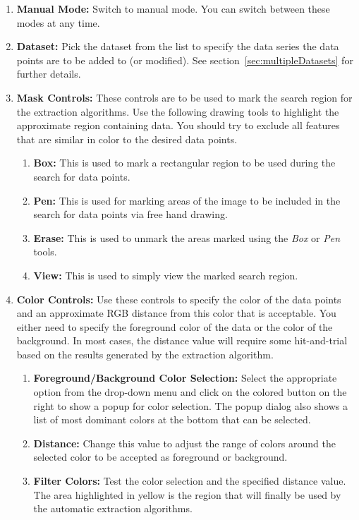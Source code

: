 \documentclass[letterpaper, 11pt]{article}
\begin{document}
\begin{enumerate}
\item{{\bf Manual Mode: }Switch to manual mode. You can switch between these modes at any time.}
\item{{\bf Dataset: }Pick the dataset from the list to specify the data series the data points are to be added to (or modified). See section~\ref{sec:multipleDatasets} for further details.}
\item{{\bf Mask Controls:} These controls are to be used to mark the search region for the extraction algorithms. Use the following drawing tools to highlight the approximate region containing data. You should try to exclude all features that are similar in color to the desired data points.}
\begin{enumerate}
    \item{{\bf Box: }This is used to mark a rectangular region to be used during the search for data points.}
    \item{{\bf Pen: }This is used for marking areas of the image to be included in the search for data points via free hand drawing.}
    \item{{\bf Erase: }This is used to unmark the areas marked using the \emph{Box} or \emph{Pen} tools.}
    \item{{\bf View: }This is used to simply view the marked search region.}
\end{enumerate}
\item{{\bf Color Controls: } Use these controls to specify the color of the data points and an approximate RGB distance from this color that is acceptable. You either need to specify the foreground color of the data or the color of the background. In most cases, the distance value will require some hit-and-trial based on the results generated by the extraction algorithm.}
\begin{enumerate}
    \item{{\bf Foreground/Background Color Selection: }Select the appropriate option from the drop-down menu and click on the colored button on the right to show a popup for color selection. The popup dialog also shows a list of most dominant colors at the bottom that can be selected.}
    \item{{\bf Distance: }Change this value to adjust the range of colors around the selected color to be accepted as foreground or background.}
    \item{{\bf Filter Colors: }Test the color selection and the specified distance value. The area highlighted in yellow is the region that will finally be used by the automatic extraction algorithms.}

\end{enumerate}
\end{enumerate}
\end{document}
